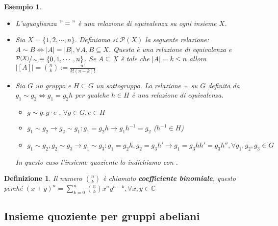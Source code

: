 \documentclass[a4paper,12pt]{article}
\theoremstyle{def}
\newtheorem*{definition}{Definizione}
\theoremstyle{prop}
\theoremstyle{esempio}
\newtheorem*{example}{Esempio}
\theoremstyle{dimostrazione}
\theoremstyle{teo}
\theoremstyle{osservazione}
\begin{document}
\begin{example}
    \
    \begin{itemize}
        \item L'uguaglianza \("="\) è una relazione di equivalenza
              su ogni insieme \(X\).
        \item Sia \(X = \{1,2,\cdots,n\}\). Definiamo si \(\mathcal{P}(X)\)
              la seguente relazione:
              \(A \sim B \Leftrightarrow |A| = |B|, \forall A,B \subseteq X\).
              Questa è una relazione di equivalenza e \(\sfrac{\mathcal{P}(X)}{\sim}
              \equiv \{0,1,\cdots,n\}\). Se \(A \subseteq X\) è tale che
              \(|A| = k \leq n\) allora \(|[A]| = \binom{n}{k} := \frac{n!}{k!(n-k)!}\)
        \item Sia \(G\) un gruppo e \(H \subseteq G\) un sottogruppo. La relazione
              \(\sim \) su \(G\) definita da \(g_1 \sim g_2 \Leftrightarrow g_1=g_2 h\)
              per qualche \(h \in H\) è una relazione di equivalenza.\
              \begin{itemize}
                  \item \(g \sim g : g \cdot e \text{ , } \forall g \in G , e \in H\)
                  \item \(g_1 \sim g_2 \rightarrow g_2 \sim g_1 : g_1 = g_2 h \rightarrow
                        g_1 h^{-1} = g_2\) (\(h^{-1} \in H\))
                  \item \(g_1 \sim g_2 , g_2 \sim g_3 \rightarrow g_1 \sim g_3 :
                        g_1 = g_2 h, g_2 = g_3 h' \rightarrow g_1 = g_3 h h' = g_3 h''
                        , \forall g_1,g_2,g_3 \in G\)
              \end{itemize}
              In questo caso l'insieme quoziente lo indichiamo con .

    \end{itemize}
\end{example}

\begin{definition}
    Il numero \(\binom{n}{k}\) è chiamato \textbf{coefficiente binomiale},
    questo perché \((x+y)^n = \sum_{k=0}^{n} \binom{n}{k} x^n y^{n-k},
    \forall x,y \in \mathbb{C} \)
\end{definition}


\subsection{Insieme quoziente per gruppi abeliani}
\end{document}
